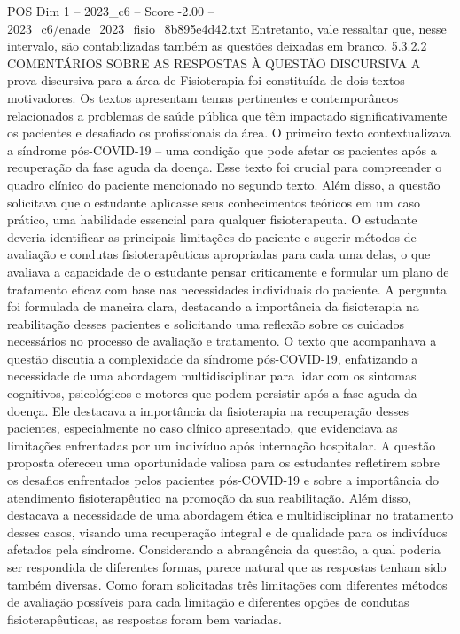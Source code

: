 \begin{textsample}{POS Dim 1 – 2023\_c6 – Score -2.00 – 2023\_c6/enade\_2023\_fisio\_8b895e4d42.txt}
Entretanto, vale ressaltar que, nesse intervalo, são contabilizadas também as questões deixadas em branco. 5.3.2.2 COMENTÁRIOS SOBRE AS RESPOSTAS À QUESTÃO DISCURSIVA A prova discursiva para a área de Fisioterapia foi constituída de dois textos motivadores.
Os textos apresentam temas pertinentes e contemporâneos relacionados a problemas de saúde pública que têm impactado significativamente os pacientes e desafiado os profissionais da área.
O primeiro texto contextualizava a síndrome pós-COVID-19 – uma condição que pode afetar os pacientes após a recuperação da fase aguda da doença.
Esse texto foi crucial para compreender o quadro clínico do paciente mencionado no segundo texto.
Além disso, a questão solicitava que o estudante aplicasse seus conhecimentos teóricos em um caso prático, uma habilidade essencial para qualquer fisioterapeuta.
O estudante deveria identificar as principais limitações do paciente e sugerir métodos de avaliação e condutas fisioterapêuticas apropriadas para cada uma delas, o que avaliava a capacidade de o estudante pensar criticamente e formular um plano de tratamento eficaz com base nas necessidades individuais do paciente.
A pergunta foi formulada de maneira clara, destacando a importância da fisioterapia na reabilitação desses pacientes e solicitando uma reflexão sobre os cuidados necessários no processo de avaliação e tratamento.
O texto que acompanhava a questão discutia a complexidade da síndrome pós-COVID-19, enfatizando a necessidade de uma abordagem multidisciplinar para lidar com os sintomas cognitivos, psicológicos e motores que podem persistir após a fase aguda da doença.
Ele destacava a importância da fisioterapia na recuperação desses pacientes, especialmente no caso clínico apresentado, que evidenciava as limitações enfrentadas por um indivíduo após internação hospitalar.
A questão proposta ofereceu uma oportunidade valiosa para os estudantes refletirem sobre os desafios enfrentados pelos pacientes pós-COVID-19 e sobre a importância do atendimento fisioterapêutico na promoção da sua reabilitação.
Além disso, destacava a necessidade de uma abordagem ética e multidisciplinar no tratamento desses casos, visando uma recuperação integral e de qualidade para os indivíduos afetados pela síndrome.
Considerando a abrangência da questão, a qual poderia ser respondida de diferentes formas, parece natural que as respostas tenham sido também diversas.
Como foram solicitadas três limitações com diferentes métodos de avaliação possíveis para cada limitação e diferentes opções de condutas fisioterapêuticas, as respostas foram bem variadas.

\end{textsample}
